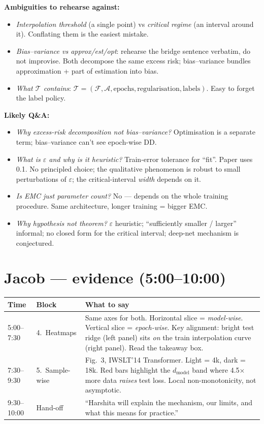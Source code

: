 \documentclass[10pt,a4paper]{article}
\newcommand{\spk}[2]{\textcolor{#1}{\textbf{#2}}}
\newcommand{\T}{\mathcal{T}}
\newcommand{\F}{\mathcal{F}}
\begin{document}
\textbf{Ambiguities to rehearse against:}
\begin{itemize}
\item \emph{Interpolation threshold} (a single point) vs \emph{critical regime} (an interval around it). Conflating them is the easiest mistake.
\item \emph{Bias--variance vs approx/est/opt}: rehearse the bridge sentence verbatim, do not improvise. Both decompose the same excess risk; bias--variance bundles approximation + part of estimation into bias.
\item \emph{What \(\T\) contains}: \(\T = (\F, \mathcal{A}, \text{epochs}, \text{regularisation}, \text{labels})\). Easy to forget the label policy.
\end{itemize}

\textbf{Likely Q\&A:}
\begin{itemize}
\item \emph{Why excess-risk decomposition not bias--variance?} Optimisation is a separate term; bias--variance can't see epoch-wise DD.
\item \emph{What is \(\varepsilon\) and why is it heuristic?} Train-error tolerance for ``fit''. Paper uses 0.1. No principled choice; the qualitative phenomenon is robust to small perturbations of \(\varepsilon\); the critical-interval \emph{width} depends on it.
\item \emph{Is EMC just parameter count?} No --- depends on the whole training procedure. Same architecture, longer training = bigger EMC.
\item \emph{Why hypothesis not theorem?} \(\varepsilon\) heuristic; ``sufficiently smaller / larger'' informal; no closed form for the critical interval; deep-net mechanism is conjectured.
\end{itemize}

\section{\spk{jacobteal}{Jacob --- evidence (5:00--10:00)}}

\begin{tabularx}{\linewidth}{@{}p{1.6cm}p{3cm}X@{}}
\toprule
Time & Block & What to say\\
\midrule
5:00--7:30 & 4.~Heatmaps & Same axes for both. Horizontal slice = \emph{model-wise}. Vertical slice = \emph{epoch-wise}. Key alignment: bright test ridge (left panel) sits \emph{on} the train interpolation curve (right panel). Read the takeaway box.\\
7:30--9:30 & 5.~Sample-wise & Fig.~3, IWSLT'14 Transformer. Light = 4k, dark = 18k. Red bars highlight the \(d_{\text{model}}\) band where 4.5\(\times\) more data \emph{raises} test loss. Local non-monotonicity, not asymptotic.\\
9:30--10:00 & Hand-off & ``Harshita will explain the mechanism, our limits, and what this means for practice.''\\
\bottomrule
\end{tabularx}
\end{document}
